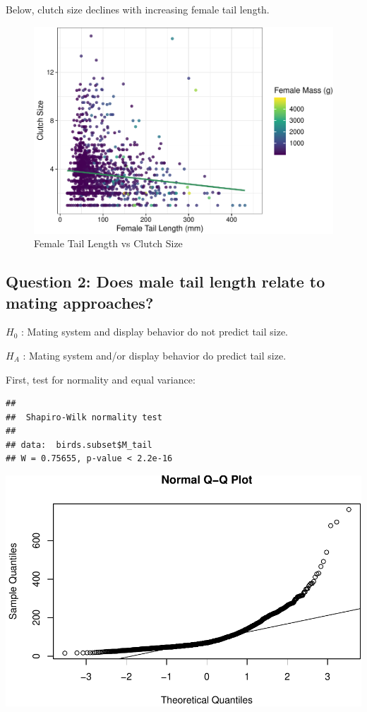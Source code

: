 \documentclass[
  12pt,
]{article}
\begin{document}
\newpage

Below, clutch size declines with increasing female tail length.

\begin{figure}
\centering
\includegraphics{Project_Code_files/figure-latex/q-1_plot_main-1.pdf}
\caption{Female Tail Length vs Clutch Size}
\end{figure}

\newpage

\hypertarget{question-2-does-male-tail-length-relate-to-mating-approaches}{%
\subsection{Question 2: Does male tail length relate to mating
approaches?}\label{question-2-does-male-tail-length-relate-to-mating-approaches}}

\(H_0\) : Mating system and display behavior do not predict tail size.

\(H_A\) : Mating system and/or display behavior do predict tail size.

First, test for normality and equal variance:

\begin{verbatim}
## 
##  Shapiro-Wilk normality test
## 
## data:  birds.subset$M_tail
## W = 0.75655, p-value < 2.2e-16
\end{verbatim}

\includegraphics{Project_Code_files/figure-latex/question_2_part_1-1.pdf}
\end{document}
